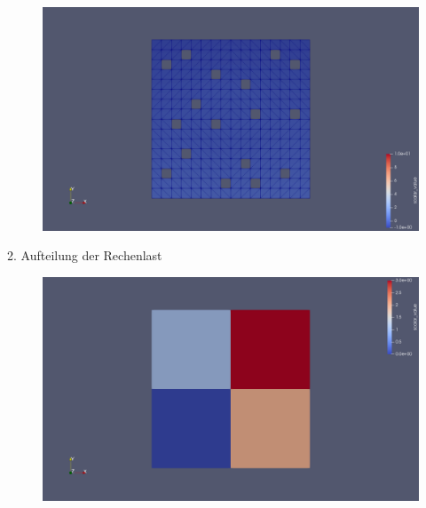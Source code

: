\documentclass[12pt,a4paper]{scrartcl}
\numberwithin{equation}{section}
\begin{document}
\begin{enumerate}[label=(\roman*)]
\begin{figure}[H]
	\centering
		\includegraphics[width=\textwidth]{../Aufgabe6/Problem_Discontinuous/Mash_Square500/level_0/geometrie.png} 
\end{figure}
2. Aufteilung der Rechenlast
\begin{figure}[H]
	\centering
		\includegraphics[width=\textwidth]{../Aufgabe6/Problem_Discontinuous/Mesh_UnitSquare8Triangles/level_3/process.png} 
\end{figure}



\end{enumerate}
\end{document}
